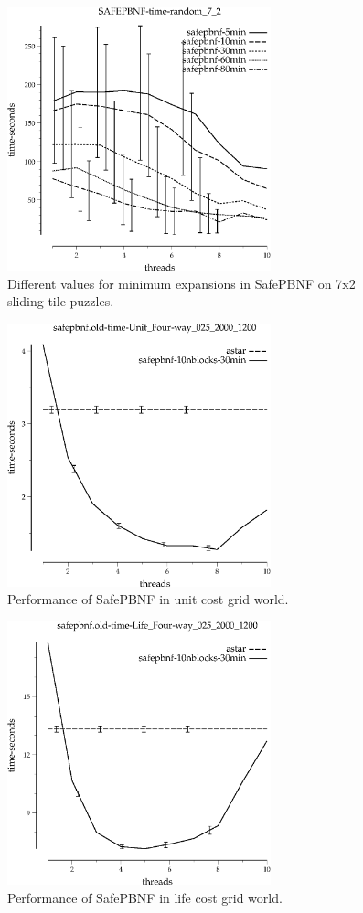 \documentclass{article}
\begin{document}
\begin{figure}[h!]
\includegraphics[width=3in]{../graphs/tiles_random_7_2/SAFEPBNF-time-random_7_2.eps}
\caption{Different values for minimum expansions in SafePBNF on 7x2 sliding tile puzzles.}
\label{fig:SafePBNF-min-tile}
\end{figure}

\begin{figure}[h!]
\includegraphics[width=3in]{../graphs/seth/grid-unit-single/SAFEPBNF.eps}
\caption{Performance of SafePBNF in unit cost grid world.}
\label{fig:SafePBNF-grid}
\end{figure}

\begin{figure}[h!]
\includegraphics[width=3in]{../graphs/seth/grid-life-single/SAFEPBNF.eps}
\caption{Performance of SafePBNF in life cost grid world.}
\label{fig:SafePBNF-life}
\end{figure}
\end{document}
